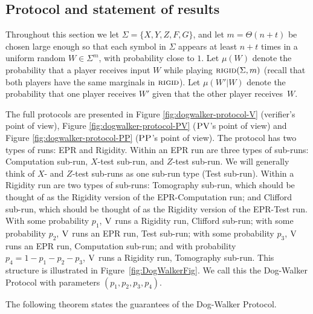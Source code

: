 
\subsection{Protocol and statement of results}


Throughout this section we 
let $\Sigma=\{X,Y,Z,F,G\}$, and let $m=\Theta(n+t)$ be chosen 
large enough so that each symbol in $\Sigma$ appears at least $n+t$ times in a uniform random $W\in\Sigma^m$, with probability close to $1$.
Let $\mu({W})$ denote the probability that a player receives input ${W}$ while playing $\textsc{rigid}(\Sigma,m)$ (recall that both players have the same marginals in $\textsc{rigid}$). Let $\mu({W}'|{W})$ denote the probability that one player receives ${W}'$ given that the other player receives~${W}$. 

The full protocols are presented in Figure \ref{fig:dogwalker-protocol-V} (verifier's point of view), Figure \ref{fig:dogwalker-protocol-PV} ($\textsc{PV}$'s point of view) and Figure \ref{fig:dogwalker-protocol-PP} ($\textsc{PP}$'s point of view). The protocol has two 
types of runs: 
EPR and Rigidity. Within an EPR run are three 
types of sub-runs: 
Computation sub-run, $X$-test sub-run, and $Z$-test sub-run. We will generally think of $X$- and $Z$-test sub-runs as one sub-run type (Test sub-run). Within a Rigidity run are two types of sub-runs: Tomography sub-run, which should be thought of as the Rigidity version of the EPR-Computation run; and Clifford sub-run, which should be thought of as the Rigidity version of the EPR-Test run. With some probability $p_1$, $\textsc{V}$ runs a Rigidity run, Clifford sub-run; with some probability $p_2$, $\textsc{V}$ runs an EPR run, Test sub-run; with some probability $p_3$, $\textsc{V}$ runs an EPR run, Computation sub-run; and with probability $p_4=1-p_1-p_2-p_3$, $\textsc{V}$ runs a Rigidity run, Tomography sub-run. This structure is illustrated in Figure~\ref{fig:DogWalkerFig}. We call this the Dog-Walker Protocol with parameters $(p_1,p_2,p_3,p_4)$.

 



The following theorem states the guarantees of the Dog-Walker Protocol.

